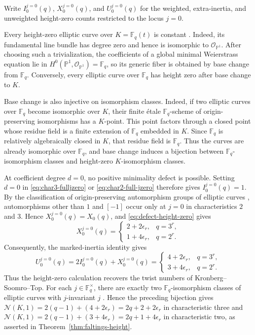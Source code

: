 \documentclass[a4paper,12pt]{amsart}
\theoremstyle{definition}
\newcommand{\Fb}{\mathbb{F}}
\newcommand{\Nc}{\mathcal{N}}
\newcommand{\Pb}{\mathbb{P}}
\begin{document}
Write $I_0^{j=0}(q)$, $X_0^{j=0}(q)$, and $U_0^{j=0}(q)$ for the weighted, extra-inertia, and unweighted height-zero counts restricted to the locus $j=0$.

Every height-zero elliptic curve over $K=\Fb_q(t)$ is constant \cite[Section~4.15]{dJ2}.  Indeed, its fundamental line bundle has degree zero and hence is isomorphic to $\mathcal O_{\Pb^1}$.  After choosing such a trivialization, the coefficients of a global minimal Weierstrass equation lie in $H^0(\Pb^1,\mathcal O_{\Pb^1})=\Fb_q$, so its generic fiber is obtained by base change from $\Fb_q$.  Conversely, every elliptic curve over $\Fb_q$ has height zero after base change to $K$.

Base change is also injective on isomorphism classes.  Indeed, if two elliptic curves over $\Fb_q$ become isomorphic over $K$, their finite \'etale $\Fb_q$-scheme of origin-preserving isomorphisms has a $K$-point.  This point factors through a closed point whose residue field is a finite extension of $\Fb_q$ embedded in $K$.  Since $\Fb_q$ is relatively algebraically closed in $K$, that residue field is $\Fb_q$.  Thus the curves are already isomorphic over $\Fb_q$, and base change induces a bijection between $\Fb_q$-isomorphism classes and height-zero $K$-isomorphism classes.

At coefficient degree $d=0$, no positive minimality defect is possible.  Setting $d=0$ in \eqref{eq:char3-fulljzero} or \eqref{eq:char2-full-jzero} therefore gives $I_0^{j=0}(q)=1$.  By the classification of origin-preserving automorphism groups of elliptic curves \cite[Appendix~A, Proposition~1.2(c)]{Silverman}, automorphisms other than $1$ and $[-1]$ occur only at $j=0$ in characteristics $2$ and $3$.  Hence $X_0^{j=0}(q)=X_0(q)$, and \eqref{eq:defect-height-zero} gives
\[
X_0^{j=0}(q)
=
\begin{cases}
2+2\epsilon_r,&q=3^r,\\
1+4\epsilon_r,&q=2^r.
\end{cases}
\]
Consequently, the marked-inertia identity gives
\[
U_0^{j=0}(q)
=
2I_0^{j=0}(q)+X_0^{j=0}(q)
=
\begin{cases}
4+2\epsilon_r,&q=3^r,\\
3+4\epsilon_r,&q=2^r.
\end{cases}
\]
Thus the height-zero calculation recovers the twist numbers of Kronberg--Soomro--Top.  For each $j\in\Fb_q^\times$, there are exactly two $\Fb_q$-isomorphism classes of elliptic curves with $j$-invariant $j$ \cite[Propositions~2.2 and~3.2]{KST}.  Hence the preceding bijection gives $\Nc(K,1)=2(q-1)+(4+2\epsilon_r)=2q+2+2\epsilon_r$ in characteristic three and $\Nc(K,1)=2(q-1)+(3+4\epsilon_r)=2q+1+4\epsilon_r$ in characteristic two, as asserted in Theorem~\ref{thm:faltings-height}. 
\end{document}
